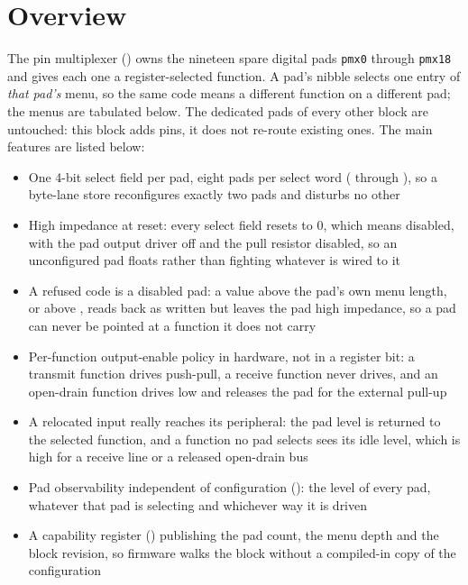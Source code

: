 \section{Overview}

The pin multiplexer () owns the nineteen spare digital pads \texttt{pmx0} through \texttt{pmx18} and gives each one a register-selected function. A pad's  nibble selects one entry of \emph{that pad's} menu, so the same code means a different function on a different pad; the menus are tabulated below. The dedicated pads of every other block are untouched: this block adds pins, it does not re-route existing ones. The main features are listed below:

\begin{itemize}
	\item One 4-bit select field per pad, eight pads per select word ( through ), so a byte-lane store reconfigures exactly two pads and disturbs no other
	\item High impedance at reset: every select field resets to 0, which means disabled, with the pad output driver off and the pull resistor disabled, so an unconfigured pad floats rather than fighting whatever is wired to it
	\item A refused code is a disabled pad: a value above the pad's own menu length, or above , reads back as written but leaves the pad high impedance, so a pad can never be pointed at a function it does not carry
	\item Per-function output-enable policy in hardware, not in a register bit: a transmit function drives push-pull, a receive function never drives, and an open-drain function drives low and releases the pad for the external pull-up
	\item A relocated input really reaches its peripheral: the pad level is returned to the selected function, and a function no pad selects sees its idle level, which is high for a receive line or a released open-drain bus
	\item Pad observability independent of configuration (): the level of every pad, whatever that pad is selecting and whichever way it is driven
	\item A capability register () publishing the pad count, the menu depth and the block revision, so firmware walks the block without a compiled-in copy of the configuration
\end{itemize}

